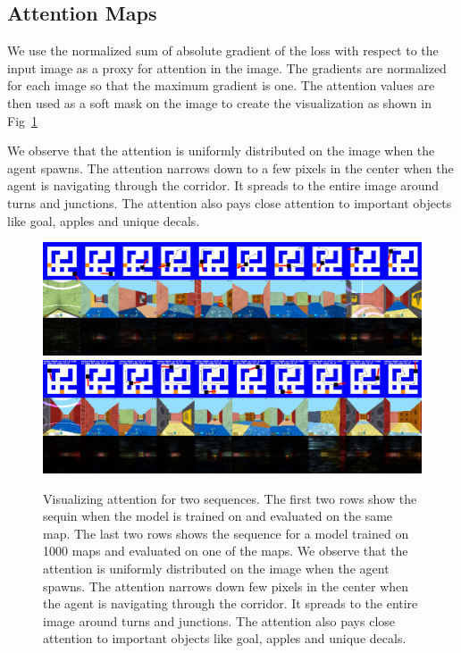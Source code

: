 

\subsection{Attention Maps}
We use the normalized sum of absolute gradient of the loss with respect to the input image as a proxy for attention in the image.
The gradients are normalized for each image so that the maximum gradient is one. The attention values are then used as a soft mask on the image to create the visualization as shown in Fig~\ref{fig:attention}

We observe that the attention is uniformly distributed on the image when the agent spawns. The attention narrows down to a few pixels in the center when the agent is navigating through the corridor. It spreads to the entire image around turns and junctions. The attention also pays close attention to important objects like goal, apples and unique decals.

\begin{figure}
\includegraphics[width=\textwidth,trim=0 0 0 336pt,clip]{./exp-results/training-09x09-0127-on-0127.png}\vspace{1ex}\\
%
\includegraphics[width=\textwidth,trim=0 0 0 336pt,clip]{./exp-results/training-1000-on-0127.png}%
\caption{Visualizing attention for two sequences. The first two rows show the sequin when the model is trained on and evaluated on the same map. The last two rows shows the sequence for a model trained on 1000 maps and evaluated on one of the maps. We observe that the attention is uniformly distributed on the image when the agent spawns. The attention narrows down few pixels in the center when the agent is navigating through the corridor. It spreads to the entire image around turns and junctions. The attention also pays close attention to important objects like goal, apples and unique decals.}
\label{fig:attention}
\end{figure}


